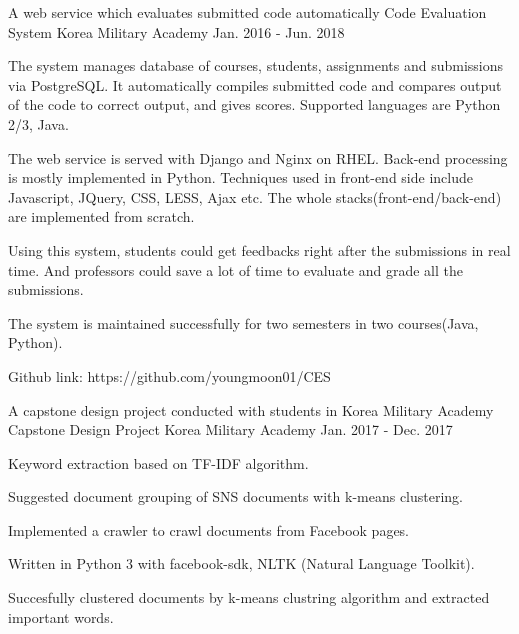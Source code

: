 


\begin{cventries}


\cventry
{A web service which evaluates submitted code automatically} %
{Code Evaluation System} %
{Korea Military Academy} %
{Jan. 2016 - Jun. 2018} %
{ %
\begin{cvitems}
\item {The system manages database of courses, students, assignments and submissions
via PostgreSQL. It automatically \newline compiles submitted code and compares output
of the code to correct output, and gives scores. Supported languages are Python 2/3, Java.}
\item {The web service is served with Django and Nginx on RHEL. Back-end processing is mostly implemented in Python.
Techniques used in front-end side include Javascript, JQuery, CSS, LESS, Ajax etc.
The whole stacks(front-end/back-end) are implemented from scratch.}
\item {Using this system, students could get feedbacks right after the submissions in real time.
And professors could save a lot of time to evaluate and grade all the submissions.}
\item {The system is maintained successfully for two semesters in two courses(Java, Python).}
\item {Github link: https://github.com/youngmoon01/CES}
\end{cvitems}
}


\cventry
{A capstone design project conducted with students in Korea Military Academy} %
{Capstone Design Project} %
{Korea Military Academy} %
{Jan. 2017 - Dec. 2017} %
{ %
\begin{cvitems}
\item {Keyword extraction based on TF-IDF algorithm.}
\item {Suggested document grouping of SNS documents with k-means clustering.}
\item {Implemented a crawler to crawl documents from Facebook pages.}
\item {Written in Python 3 with facebook-sdk, NLTK (Natural Language Toolkit).}
\item {Succesfully clustered documents by k-means clustring algorithm and extracted important words.}
\end{cvitems}
}


\end{cventries}
